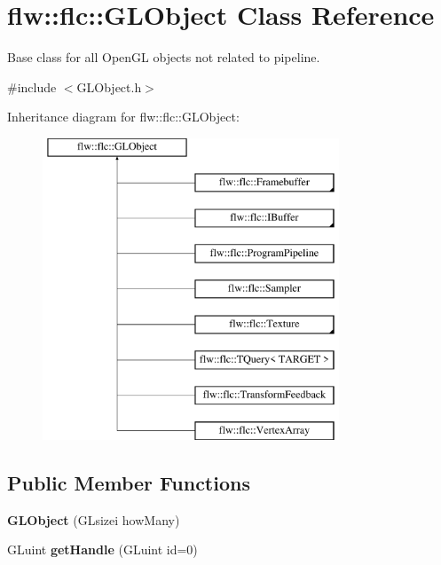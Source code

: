 \hypertarget{classflw_1_1flc_1_1GLObject}{}\section{flw\+:\+:flc\+:\+:G\+L\+Object Class Reference}
\label{classflw_1_1flc_1_1GLObject}


Base class for all Open\+GL objects not related to pipeline.  




{\ttfamily \#include $<$G\+L\+Object.\+h$>$}

Inheritance diagram for flw\+:\+:flc\+:\+:G\+L\+Object\+:\begin{figure}[H]
\begin{center}
\leavevmode
\includegraphics[height=9.000000cm]{classflw_1_1flc_1_1GLObject}
\end{center}
\end{figure}
\subsection*{Public Member Functions}
\begin{DoxyCompactItemize}
\item 
\mbox{\label{classflw_1_1flc_1_1GLObject_aec8d37982901c84d58f9319c863d0e24}} 
{\bfseries G\+L\+Object} (G\+Lsizei how\+Many)
\item 
\mbox{\label{classflw_1_1flc_1_1GLObject_ac23c3ec039eccfbed64799352df3dbce}} 
G\+Luint {\bfseries get\+Handle} (G\+Luint id=0)
\end{DoxyCompactItemize}
